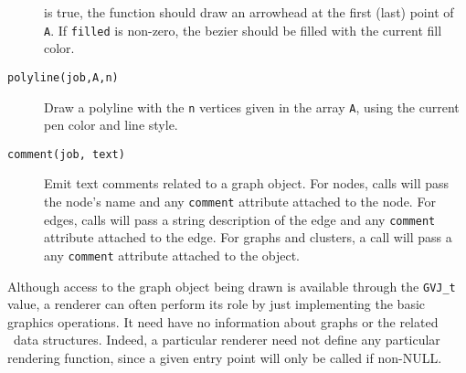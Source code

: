 \begin{description}
is true, the function should draw an arrowhead at the 
first (last) point of {\tt A}.
If {\tt filled} is non-zero, the bezier should be filled with the current
fill color.
\item[{\tt polyline(job,A,n)}]
Draw a polyline with the {\tt n} vertices given in the array {\tt A}, 
using the current pen color and line style.
\item[{\tt comment(job, text)}]
Emit text comments related to a graph object.
For nodes, calls will pass the node's name and any {\tt comment}
attribute attached to the node.
For edges, calls will pass a string description of the edge 
and any {\tt comment} attribute attached to the edge.
For graphs and clusters, a call will pass a
any {\tt comment} attribute attached to the object.
\end{description}

Although access to the graph object being drawn is available through
the {\tt GVJ\_t} value, a renderer
can often perform its role by just implementing the basic graphics operations.
It need have no information about graphs or the related \gviz\ data structures.
Indeed, a particular renderer need not define any particular rendering
function, since a given entry point will only be called if non-NULL.


